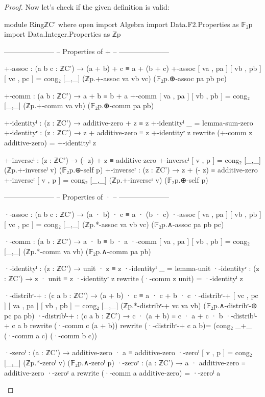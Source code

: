 \documentclass[a4paper]{report}
\theoremstyle{definition}
\begin{document}
\begin{proof}
  Now let's check if the given definition is valid:
  \begin{code}
module RingℤC' where
  open import Algebra
  import Data.F2.Properties as 𝔽₂p
  import Data.Integer.Properties as ℤp

  ---------------------
  -- Properties of + --
  ---------------------

  +-assoc : (a b c : ℤC') → (a + b) + c ≡ a + (b + c)
  +-assoc [ va , pa ] [ vb , pb ] [ vc , pc ] =
    cong₂ [_,_] (ℤp.+-assoc va vb vc) (𝔽₂p.⊕-assoc pa pb pc)

  +-comm : (a b : ℤC') → a + b ≡ b + a
  +-comm [ va , pa ] [ vb , pb ] =
    cong₂ [_,_] (ℤp.+-comm va vb) (𝔽₂p.⊕-comm pa pb)

  +-identityˡ : (z : ℤC') → additive-zero + z ≡ z
  +-identityˡ _ = lemma-sum-zero
  +-identityʳ : (z : ℤC') → z + additive-zero ≡ z
  +-identityʳ z rewrite (+-comm z additive-zero) = +-identityˡ z

  +-inverseˡ : (z : ℤC') → (- z) + z ≡ additive-zero
  +-inverseˡ [ v , p ] = cong₂ [_,_] (ℤp.+-inverseˡ v) (𝔽₂p.⊕-self p)
  +-inverseʳ : (z : ℤC') → z + (- z) ≡ additive-zero
  +-inverseʳ [ v , p ] = cong₂ [_,_] (ℤp.+-inverseʳ v) (𝔽₂p.⊕-self p)

  ---------------------
  -- Properties of · --
  ---------------------

  ·-assoc : (a b c : ℤC') → (a · b) · c ≡ a · (b · c)
  ·-assoc [ va , pa ] [ vb , pb ] [ vc , pc ] =
    cong₂ [_,_] (ℤp.*-assoc va vb vc) (𝔽₂p.∧-assoc pa pb pc)

  ·-comm : (a b : ℤC') → a · b ≡ b · a
  ·-comm [ va , pa ] [ vb , pb ] =
    cong₂ [_,_] (ℤp.*-comm va vb) (𝔽₂p.∧-comm pa pb)

  ·-identityˡ : (z : ℤC') → unit · z ≡ z
  ·-identityˡ _ = lemma-unit
  ·-identityʳ : (z : ℤC') → z · unit ≡ z
  ·-identityʳ z rewrite (·-comm z unit) = ·-identityˡ z

  ·-distribʳ-+ : (c a b : ℤC') → (a + b) · c ≡ a · c + b · c
  ·-distribʳ-+ [ vc , pc ] [ va , pa ] [ vb , pb ] =
    cong₂ [_,_] (ℤp.*-distribʳ-+ vc va vb) (𝔽₂p.∧-distribʳ-⊕ pc pa pb)
  ·-distribˡ-+ : (c a b : ℤC') → c · (a + b) ≡ c · a + c · b
  ·-distribˡ-+ c a b rewrite (·-comm c (a + b)) rewrite  (·-distribʳ-+ c a b)=
    (cong₂ _+_  (·-comm a c) (·-comm b c))

  ·-zeroˡ : (a : ℤC') → additive-zero · a ≡ additive-zero
  ·-zeroˡ [ v , p ] = cong₂ [_,_] (ℤp.*-zeroˡ v)  (𝔽₂p.∧-zeroˡ p)
  ·-zeroʳ : (a : ℤC') → a · additive-zero ≡ additive-zero
  ·-zeroʳ a rewrite (·-comm a additive-zero) = ·-zeroˡ a


\end{code}
\end{proof}
\end{document}
